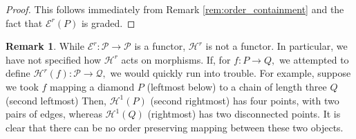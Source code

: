 \documentclass[10 pt]{amsart}
\theoremstyle{plain}
\theoremstyle{definition}
\newtheorem{rem}[thm]{Remark}
\theoremstyle{remark}
\numberwithin{equation}{section}
\begin{document}
\begin{proof}
This follows immediately from Remark \ref{rem:order_containment} and the fact that $\mathcal E^r(P)$ is graded.


\end{proof}

\begin{rem}
While $\mathcal E^r:\mathcal P \rightarrow \mathcal P$ is a functor, $\mathcal H^r$ is not a functor. In particular, we have not specified how $\mathcal H^r$ acts on morphisms. If, for $f:P \rightarrow Q,$ we attempted to define $\mathcal H^r(f):\mathcal P \rightarrow \mathcal Q,$ we would quickly run into trouble. For example, suppose we took $f$ mapping a diamond $P$ (leftmost below) to a chain of length three $Q$ (second leftmost) Then, $\mathcal H^1(P)$ (second rightmost) has four points, with two pairs of edges, whereas $\mathcal H^1(Q)$ (rightmost) has two disconnected points. It is clear that there can be no order preserving mapping between these two objects.

\begin{figure}[h]
\begin{center}
 \quad
{}\quad
{} \quad
{}
\end{center}
\caption{}
\end{figure}
\end{rem}
\end{document}
